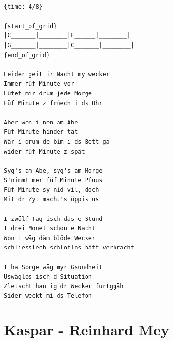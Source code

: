 \documentclass[
]{book}
\let\stdsection\section
\renewcommand\section{\clearpage\stdsection}
\begin{document}
\begin{verbatim}

{time: 4/8}

{start_of_grid}
|C_______|________|F______|________|
|G_______|________|C_______|________|
{end_of_grid}

Leider geit ir Nacht my wecker
Immer füf Minute vor
Lütet mir drum jede Morge
Füf Minute z'früech i ds Ohr

Aber wen i nen am Abe
Füf Minute hinder tät
Wär i drum de bim i-ds-Bett-ga
wider füf Minute z spät

Syg's am Abe, syg's am Morge
S'nimmt mer füf Minute Pfuus
Füf Minute sy nid vil, doch
Mit dr Zyt macht's öppis us

I zwölf Tag isch das e Stund
I drei Monet schon e Nacht
Won i wäg däm blöde Wecker
schliesslech schloflos hätt verbracht

I ha Sorge wäg myr Gsundheit
Uswäglos isch d Situation
Zletscht han ig dr Wecker furtggäh
Sider weckt mi ds Telefon
\end{verbatim}

\hypertarget{kaspar---reinhard-mey}{%
\section{Kaspar - Reinhard Mey}\label{kaspar---reinhard-mey}}
\end{document}
